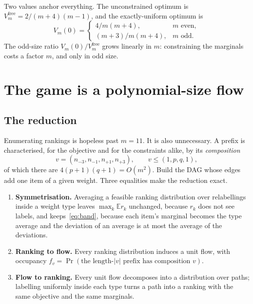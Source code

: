 

Two values anchor everything. The unconstrained optimum is
$V^{\mathrm{free}}_{m}=2/(m+4)(m-1)$, and the exactly-uniform optimum is
\begin{equation}
V_{m}(0)=
\begin{cases}
4/m(m+4), & m\text{ even},\\
(m+3)/m(m+4), & m\text{ odd}.
\end{cases}
\label{eq:vunif}
\end{equation}
The odd-size ratio $V_{m}(0)/V^{\mathrm{free}}_{m}$ grows linearly in $m$: constraining the
marginals costs a factor $m$, and only in odd size.

\section{The game is a polynomial-size flow}
\label{sec:flow}

\subsection{The reduction}

Enumerating rankings is hopeless past $m=11$. It is also unnecessary. A prefix is
characterised, for the objective and for the constraints alike, by its \emph{composition}
\begin{equation}
v=(n_{-3},n_{-1},n_{+1},n_{+3}),\qquad v\le(1,p,q,1),
\label{eq:state}
\end{equation}
of which there are $4(p+1)(q+1)=O(m^{2})$. Build the DAG whose edges add one item of a given
weight. Three equalities make the reduction exact.

\begin{enumerate}
\item[E1)] \textbf{Symmetrisation.} Averaging a feasible ranking distribution over
relabellings inside a weight type leaves $\max_{k}\mathbb{E}r_{k}$ unchanged, because
$r_{k}$ does not see labels, and keeps~\eqref{eq:band}, because each item's marginal becomes
the type average and the deviation of an average is at most the average of the deviations.
\item[E2)] \textbf{Ranking to flow.} Every ranking distribution induces a unit flow, with
occupancy $f_{v}=\Pr(\text{the length-}|v|\text{ prefix has composition }v)$.
\item[E3)] \textbf{Flow to ranking.} Every unit flow decomposes into a distribution over
paths; labelling uniformly inside each type turns a path into a ranking with the same
objective and the same marginals.
\end{enumerate}

